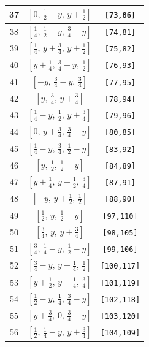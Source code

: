 \documentclass[fleqn,8pt]{jsarticle}
\begin{document}
\begin{longtable}{ccc}
37 & $\left[ 0,\, \frac{1}{2} - y,\, y + \frac{1}{2} \right]$ & {\tt [73,86]} \\ \hline
38 & $\left[ \frac{1}{4},\, \frac{1}{2} - y,\, \frac{3}{4} - y \right]$ & {\tt [74,81]} \\ \hline
39 & $\left[ \frac{1}{4},\, y + \frac{3}{4},\, y + \frac{1}{2} \right]$ & {\tt [75,82]} \\ \hline
40 & $\left[ y + \frac{1}{4},\, \frac{3}{4} - y,\, \frac{1}{2} \right]$ & {\tt [76,93]} \\ \hline
41 & $\left[ - y,\, \frac{3}{4} - y,\, \frac{3}{4} \right]$ & {\tt [77,95]} \\ \hline
42 & $\left[ y,\, \frac{3}{4},\, y + \frac{3}{4} \right]$ & {\tt [78,94]} \\ \hline
43 & $\left[ \frac{1}{4} - y,\, \frac{1}{2},\, y + \frac{3}{4} \right]$ & {\tt [79,96]} \\ \hline
44 & $\left[ 0,\, y + \frac{3}{4},\, \frac{3}{4} - y \right]$ & {\tt [80,85]} \\ \hline
45 & $\left[ \frac{1}{4} - y,\, \frac{3}{4},\, \frac{1}{2} - y \right]$ & {\tt [83,92]} \\ \hline
46 & $\left[ y,\, \frac{1}{2},\, \frac{1}{2} - y \right]$ & {\tt [84,89]} \\ \hline
47 & $\left[ y + \frac{1}{4},\, y + \frac{1}{2},\, \frac{3}{4} \right]$ & {\tt [87,91]} \\ \hline
48 & $\left[ - y,\, y + \frac{1}{2},\, \frac{1}{2} \right]$ & {\tt [88,90]} \\ \hline
49 & $\left[ \frac{1}{2},\, y,\, \frac{1}{2} - y \right]$ & {\tt [97,110]} \\ \hline
50 & $\left[ \frac{3}{4},\, y,\, y + \frac{3}{4} \right]$ & {\tt [98,105]} \\ \hline
51 & $\left[ \frac{3}{4},\, \frac{1}{4} - y,\, \frac{1}{2} - y \right]$ & {\tt [99,106]} \\ \hline
52 & $\left[ \frac{3}{4} - y,\, y + \frac{1}{4},\, \frac{1}{2} \right]$ & {\tt [100,117]} \\ \hline
53 & $\left[ y + \frac{1}{2},\, y + \frac{1}{4},\, \frac{3}{4} \right]$ & {\tt [101,119]} \\ \hline
54 & $\left[ \frac{1}{2} - y,\, \frac{1}{4},\, \frac{3}{4} - y \right]$ & {\tt [102,118]} \\ \hline
55 & $\left[ y + \frac{3}{4},\, 0,\, \frac{3}{4} - y \right]$ & {\tt [103,120]} \\ \hline
56 & $\left[ \frac{1}{2},\, \frac{1}{4} - y,\, y + \frac{3}{4} \right]$ & {\tt [104,109]} \\ \hline

\end{longtable}
\end{document}
